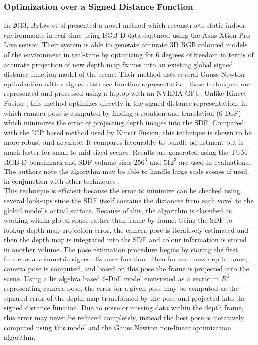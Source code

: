 \subsubsection{Optimization over a Signed Distance Function}

In 2013, Bylow et al \cite{Bylow13Real} presented a novel method which reconstructs static indoor environments in real time using RGB-D data captured using the Asus Xtion Pro Live sensor. Their system is able to generate accurate 3D RGB coloured models of the environment in real-time by optimizing for 6 degrees of freedom in terms of accurate projection of new depth map frames into an existing global signed distance function model of the scene. Their method uses several Gauss Newton optimization with a signed distance function representation, these techniques are represented and processed using a laptop with an NVIDIA GPU. Unlike Kinect Fusion \cite{Newcombe11Kinectfusion}, this method optimizes directly in the signed distance representation, in which camera pose is computed by finding a rotation and translation (6-DoF) which minimizes the error of projecting depth images into the SDF. Compared with the ICP based method used by Kinect Fusion, this technique is shown to be more robust and accurate. It compares favourably to bundle adjustment but is much faster for small to mid sized scenes. Results are generated using the TUM RGB-D benchmark and SDF volume sizes $256^3$ and $512^3$ are used in evaluations. The authors note the algorithm may be able to handle large scale scenes if used in conjunction with other techniques \cite{Kaess11Isam2,Kummerle11G}. \\

This technique is efficient because the error to minimize can be checked using several look-ups since the SDF itself contains the distances from each voxel to the global model's actual surface. Because of this, the algorithm is classified as working within global space rather than frame-by-frame. Using the SDF to lookup depth map projection error, the camera pose is iteratively estimated and then the depth map is integrated into the SDF and colour information is stored in another volume. The pose estimation procedure begins by storing the first frame as a volumetric signed distance function. Then for each new depth frame, camera pose is computed, and based on this pose the frame is projected into the scene. Using a lie algebra based 6-DoF model \cite{Ma12Invitation} envisioned as a vector in $R^6$ representing camera pose, the error for a given pose may be computed as the squared error of the depth map transformed by the pose and projected into the signed distance function. Due to noise or missing data within the depth frame, this error may never be reduced completely, instead the best pose is iteratively computed using this model and the Gauss Newton non-linear optimization algorithm. \\

